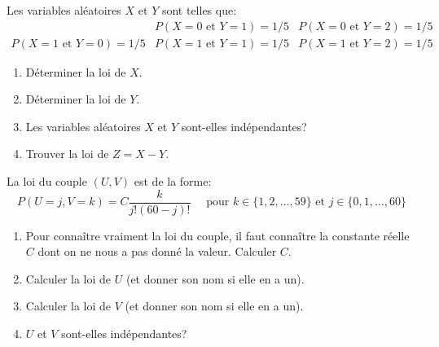 \documentclass[a4paper,12pt,reqno]{amsart}
\begin{document}


\begin{exo}

  Les variables aléatoires $X$ et $Y$ sont telles que:
    $$
      \begin{array}{ccc}
                                   & P(X=0 \text{ et } Y=1)=1/5 & P(X=0 \text{ et } Y=2)=1/5 \\
        P(X=1 \text{ et } Y=0)=1/5 & P(X=1 \text{ et } Y=1)=1/5 & P(X=1 \text{ et } Y=2)=1/5
      \end{array}
    $$
  \begin{enumerate}
    \item Déterminer la loi de $X$.
    \item Déterminer la loi de $Y$.
    \item Les variables aléatoires $X$ et $Y$ sont-elles indépendantes?
    \item Trouver la loi de $Z = X-Y$.
  \end{enumerate}

\end{exo}

\begin{exo}

  La loi du couple $(U,V)$ est de la forme:
    $$
      P(U=j,V=k)=C\frac{k}{j!(60-j)!} \quad\text{ pour } k\in\{1,2,\ldots,59\} \text{ et } j\in\{0,1,\ldots,60\}
    $$
  \begin{enumerate}
    \item Pour connaître vraiment la loi du couple, il faut connaître la constante réelle $C$ dont on ne nous a pas donné la valeur. Calculer $C$.
    \item Calculer la loi de $U$ (et donner son nom si elle en a un).
    \item Calculer la loi de $V$ (et donner son nom si elle en a un).
    \item $U$ et $V$ sont-elles indépendantes?
  \end{enumerate}

\end{exo}
\end{document}
